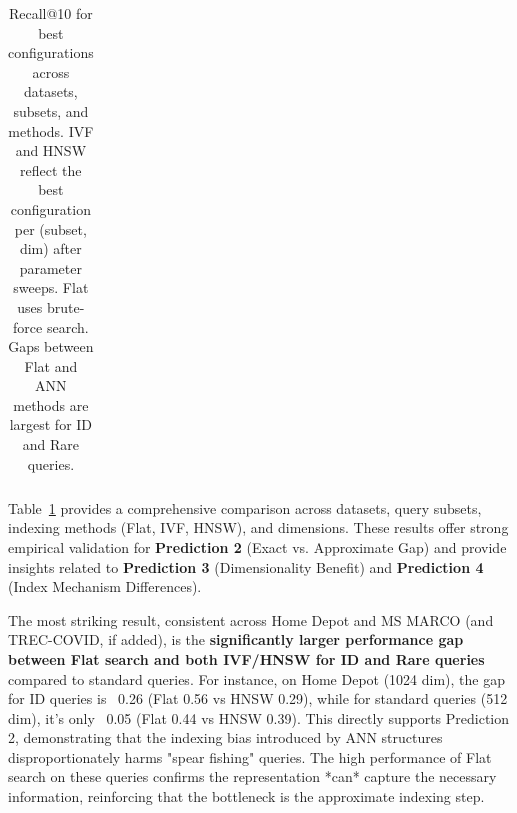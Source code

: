 \documentclass[manuscript]{acmart}
\begin{document}
\begin{table}[ht]
\begin{tabular}{llllr}
\bottomrule
\end{tabular}
\caption{Recall@10 for best configurations across datasets, subsets, and methods. IVF and HNSW reflect the best configuration per (subset, dim) after parameter sweeps. Flat uses brute-force search. Gaps between Flat and ANN methods are largest for ID and Rare queries.}
\label{tab:detailed-results} %
\end{table}

Table~\ref{tab:detailed-results} provides a comprehensive comparison across datasets, query subsets, indexing methods (Flat, IVF, HNSW), and dimensions. These results offer strong empirical validation for \textbf{Prediction 2} (Exact vs. Approximate Gap) and provide insights related to \textbf{Prediction 3} (Dimensionality Benefit) and \textbf{Prediction 4} (Index Mechanism Differences).

The most striking result, consistent across Home Depot and MS MARCO (and TREC-COVID, if added), is the \textbf{significantly larger performance gap between Flat search and both IVF/HNSW for ID and Rare queries} compared to standard queries. For instance, on Home Depot (1024 dim), the gap for ID queries is ~0.26 (Flat 0.56 vs HNSW 0.29), while for standard queries (512 dim), it's only ~0.05 (Flat 0.44 vs HNSW 0.39). This directly supports Prediction 2, demonstrating that the indexing bias introduced by ANN structures disproportionately harms "spear fishing" queries. The high performance of Flat search on these queries confirms the representation *can* capture the necessary information, reinforcing that the bottleneck is the approximate indexing step.
\end{document}
